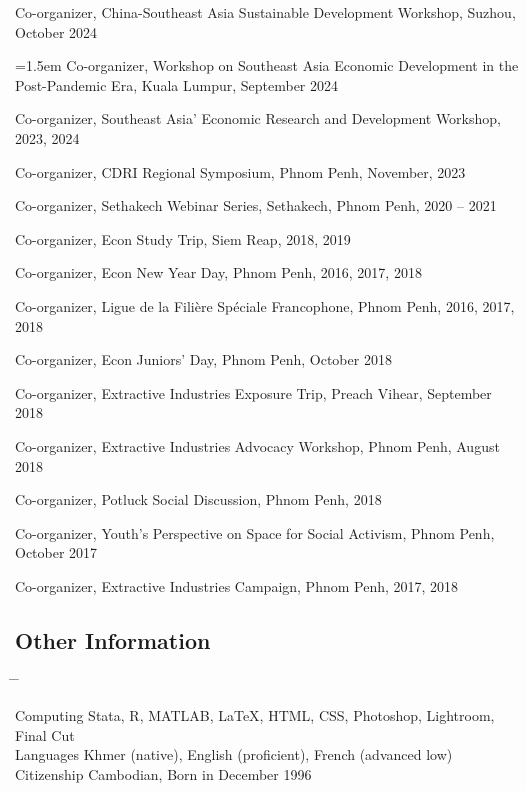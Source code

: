 \documentclass[10pt,a4paper]{article}
\newcommand{\tabbedblock}[1]{

	\begin{tabbing}
		\hspace{2cm} \= \hspace{4cm} \= \kill
		#1
	\end{tabbing}
}
\begin{document}
	Co-organizer, China-Southeast Asia Sustainable Development Workshop, Suzhou, October 2024

	\hangindent=1.5em
	Co-organizer, Workshop on Southeast Asia Economic Development in the Post-Pandemic Era, Kuala Lumpur, September 2024

	Co-organizer, Southeast Asia' Economic Research and Development Workshop, 2023, 2024
	
	Co-organizer, CDRI Regional Symposium, Phnom Penh, November, 2023
	
	Co-organizer, Sethakech Webinar Series, Sethakech, Phnom Penh, 2020 -- 2021

	Co-organizer, Econ Study Trip, Siem Reap, 2018, 2019

	Co-organizer, Econ New Year Day, Phnom Penh, 2016, 2017, 2018

	Co-organizer, Ligue de la Filière Spéciale Francophone, Phnom Penh, 2016, 2017, 2018
		
	Co-organizer, Econ Juniors' Day, Phnom Penh, October 2018
		
	Co-organizer, Extractive Industries Exposure Trip, Preach Vihear, September 2018

	Co-organizer, Extractive Industries Advocacy Workshop, Phnom Penh, August 2018
		
	Co-organizer, Potluck Social Discussion, Phnom Penh, 2018
			
	Co-organizer, Youth's Perspective on Space for Social Activism, Phnom Penh, October 2017
		
	Co-organizer, Extractive Industries Campaign, Phnom Penh, 2017, 2018

\subsection*{Other Information}

\tabbedblock{
	Computing \> Stata, R, MATLAB, \LaTeX, HTML, CSS, Photoshop, Lightroom, Final Cut\\
	
	Languages \> Khmer (native), English (proficient), French (advanced low)\\
	
	Citizenship \> Cambodian, Born in December 1996
}
\end{document}
